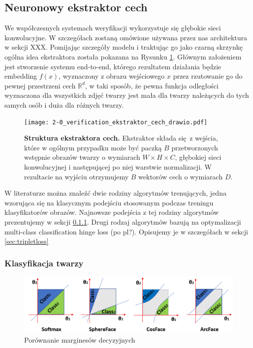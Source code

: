 \subsection{Neuronowy ekstraktor cech} \label{sec:ekstraktor}
We współczesnych systemach weryfikacji wykorzystuje się głębokie sieci konwolucyjne. W
szczegółach zostaną omówione używana przez nas architektura w sekcji XXX. Pomijając szczegóły
modelu i traktując go jako czarną skrzynkę ogólna idea ekstraktora została pokazana na Rysunku
\ref{fig:ekstraktor_cech}. Głównym założeniem jest stworzenie systemu end-to-end, którego
rezultatem działania będzie embedding \(f(x)\), wyznaczony z obrazu wejściowego \(x\) przez
rzutowanie go do pewnej przestrzeni cech \(\mathbb{R}^d\), w taki sposób, że pewna funkcja
odległości wyznaczona dla wszystkich zdjęć twarzy jest mała dla twarzy należących do tych samych
osób i duża dla różnych twarzy. 

\begin{figure}[h]
    \centering
    \texttt{[image: 2-0\_verification\_ekstraktor\_cech\_drawio.pdf]}
    \caption{\textbf{Struktura ekstraktora cech.} Ekstraktor składa się z wejścia, które w ogólnym przypadku może być paczką \(B\) przetworzonych wstępnie obrazów twarzy o wymiarach \( W \times H \times C\), głębokiej sieci konwolucyjnej i następującej po niej warstwie normalizacji. W rezultacie na wyjściu otrzymujemy \(B\) wektorów cech o wymiarach \(D\).}
    \label{fig:ekstraktor_cech}
\end{figure}


W literaturze można znaleźć dwie rodziny algorytmów trenujących, jedna wzorująca się na
klasycznym podejściu stosowanym podczas treningu klasyfikatorów obrazów. Najnowsze podejścia z
tej rodziny algorytmów prezentujemy w sekcji \ref{sec:klasyfikatory}. Drugi rodzaj algorytmów
bazują na optymalizacji multi-class classification hinge loss (po pl?). Opisujemy je w
szczegółach w sekcji \ref{sec:tripletloss}

\subsubsection{Klasyfikacja twarzy}\label{sec:klasyfikatory}
\begin{figure}[h!]
\centering
\includegraphics[width=1\linewidth]{img/margincompare.png}
\caption{Porównanie marginesów decyzyjnych\cite{}}
\vspace{-4mm}
\label{fig:binarymargin}
\end{figure}
